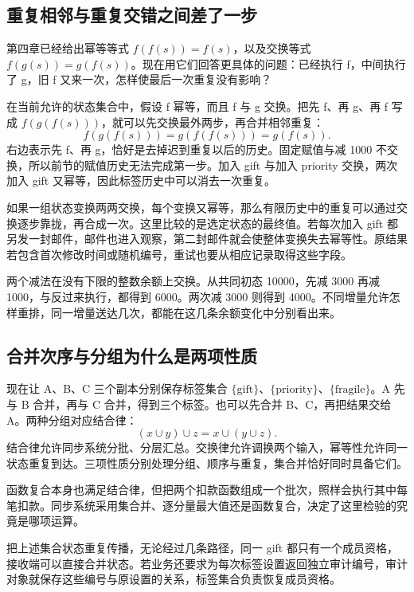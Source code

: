 \subsection*{重复相邻与重复交错之间差了一步}

第四章已经给出幂等等式 $f(f(s))=f(s)$，以及交换等式 $f(g(s))=g(f(s))$。现在用它们回答更具体的问题：已经执行 f，中间执行了 g，旧 f 又来一次，怎样使最后一次重复没有影响？

在当前允许的状态集合中，假设 f 幂等，而且 f 与 g 交换。把先 f、再 g、再 f 写成 $f(g(f(s)))$，就可以先交换最外两步，再合并相邻重复：
\[
  f(g(f(s)))=g(f(f(s)))=g(f(s)).
\]
右边表示先 f、再 g，恰好是去掉迟到重复以后的历史。固定赋值与减 1000 不交换，所以前节的赋值历史无法完成第一步。加入 gift 与加入 priority 交换，两次加入 gift 又幂等，因此标签历史中可以消去一次重复。


如果一组状态变换两两交换，每个变换又幂等，那么有限历史中的重复可以通过交换逐步靠拢，再合成一次。这里比较的是选定状态的最终值。若每次加入 gift 都另发一封邮件，邮件也进入观察，第二封邮件就会使整体变换失去幂等性。原结果若包含首次修改时间或随机编号，重试也要从相应记录取得这些字段。

两个减法在没有下限的整数余额上交换。从共同初态 10000，先减 3000 再减 1000，与反过来执行，都得到 6000。两次减 3000 则得到 4000。不同增量允许怎样重排，同一增量送达几次，都能在这几条余额变化中分别看出来。

\subsection*{合并次序与分组为什么是两项性质}

现在让 A、B、C 三个副本分别保存标签集合 $\{\mathrm{gift}\}$、$\{\mathrm{priority}\}$、$\{\mathrm{fragile}\}$。A 先与 B 合并，再与 C 合并，得到三个标签。也可以先合并 B、C，再把结果交给 A。两种分组对应结合律：
\[
  (x\cup y)\cup z=x\cup(y\cup z).
\]
结合律允许同步系统分批、分层汇总。交换律允许调换两个输入，幂等性允许同一状态重复到达。三项性质分别处理分组、顺序与重复，集合并恰好同时具备它们。

函数复合本身也满足结合律，但把两个扣款函数组成一个批次，照样会执行其中每笔扣款。同步系统采用集合并、逐分量最大值还是函数复合，决定了这里检验的究竟是哪项运算。

把上述集合状态重复传播，无论经过几条路径，同一 gift 都只有一个成员资格，接收端可以直接合并状态。若业务还要求为每次标签设置返回独立审计编号，审计对象就保存这些编号与原设置的关系，标签集合负责恢复成员资格。

